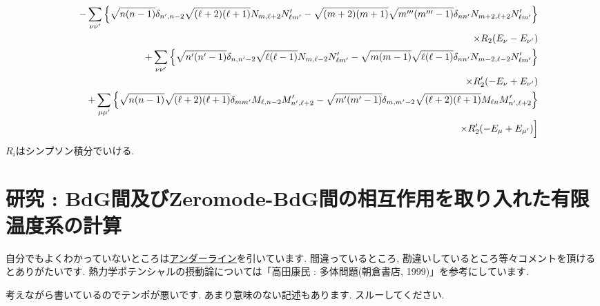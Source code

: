\documentclass[10.5pt,a4paper]{jreport}
\newcommand{\ul}[1]{\underline{#1}}
\begin{document}
\begin{eqnarray}
    \nonumber &&- \sum_{\nu\nu'}\Bqty{\sqrt{n(n-1)}\delta_{n', n-2}\sqrt{(\ell +2)(\ell +1)}N_{m, \ell +2}N_{\ell m'}' - \sqrt{(m+2)(m+1)}\sqrt{m'''(m'''-1)}\delta_{nn'}N_{m+2, \ell +2}N_{\ell m'}'}\\
    \nonumber&&\hspace{14cm}\times R_2(E_\nu - E_{\nu'})\\
    \nonumber &&+ \sum_{\nu\nu'}\Bqty{\sqrt{n'(n'-1)}\delta_{n, n'-2}\sqrt{\ell (\ell -1)}N_{m, \ell -2}N_{\ell m'}' - \sqrt{m(m-1)}\sqrt{\ell (\ell -1)}\delta_{nn'}N_{m-2, \ell -2}N_{\ell m'}'}\\
    \nonumber&&\hspace{14cm}\times R_2'(-E_\nu + E_{\nu'})\\
    \nonumber&&+\sum_{\mu\mu'}\Bqty{\sqrt{n(n-1)}\sqrt{(\ell +2)(\ell +1)}\delta_{mm'}M_{\ell , n-2}M_{n', \ell +2}' - \sqrt{m'(m'-1)}\delta_{m, m'-2}\sqrt{(\ell +2)(\ell +1)}M_{\ell n}M_{n', \ell +2}'}\\
    \nonumber&&\hspace{14cm}\times R_2'(- E_\mu + E_{\mu'})\Bigr]\\
\end{eqnarray}
$R_i$はシンプソン積分でいける.
\newpage
\chapter{研究 : BdG間及びZeromode-BdG間の相互作用を取り入れた有限温度系の計算}
自分でもよくわかっていないところは\ul{アンダーライン}を引いています. 間違っているところ, 勘違いしているところ等々コメントを頂けるとありがたいです. 熱力学ポテンシャルの摂動論については「高田康民 : 多体問題(朝倉書店, 1999)」を参考にしています.

考えながら書いているのでテンポが悪いです. あまり意味のない記述もあります. スルーしてください.
\end{document}
